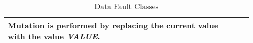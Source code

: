 \begin{table}[h]
\begin{center}
\begin{tabular}{|p{2cm}|p{2cm}|p{4cm}|p{4cm}|}
\begin{minipage}{4cm}
Mutation is performed by replacing the current value with the value \emph{VALUE}.
\end{minipage}
\\


\hline
\end{tabular}
\end{center}
\caption{Data Fault Classes}
\label{table:faultModel:FAQAS}
\end{table}%